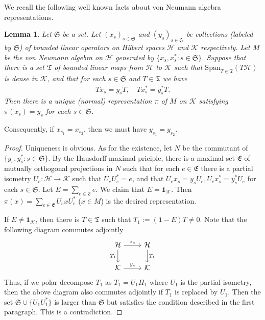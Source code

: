 \documentclass[12pt,a4paper,notitlepage]{article}
\theoremstyle{definition}
\theoremstyle{plain}
\newtheorem{lm}[df]{Lemma}
\newcommand{\fk}{\mathfrak}
\newcommand{\mc}{\mathcal}
\newcommand{\id}{\mathbf{1}}
\newcommand{\Span}{\mathrm{Span}}
\numberwithin{equation}{section}
\begin{document}
We recall the following well known facts about von Neumann algebra representations.
\begin{lm}\label{lb3}
Let $\fk S$ be a set. Let $(x_s)_{s\in\fk S}$ and $(y_s)_{s\in\fk S}$ be collections (labeled by $\fk S$) of bounded linear operators on Hilbert spaces $\mc H$ and $\mc K$ respectively. Let $M$ be the von Neumann algebra on $\mc H$ generated by $\{x_s,x_s^*:s\in \fk S\}$. Suppose that there is a set $\fk T$ of bounded  linear maps from $\mc H$ to $\mc K$ such that $\Span_{T\in\fk T}(T\mc H)$ is dense in $\mc K$, and that for each $s\in \fk S$ and $T\in\fk T$ we have
	\begin{align*}
		Tx_s=y_sT,\quad Tx_s^*=y_s^*T.	
	\end{align*}
	Then there is a unique  (normal) representation $\pi$ of $M$ on $\mc K$ satisfying $\pi(x_s)=y_s$ for each $s\in\fk S$.
\end{lm}

Consequently, if $x_{s_1}=x_{s_2}$, then we must have $y_{s_1}=y_{s_2}$.

\begin{proof}
	Uniqueness is obvious. As for the existence, let $N$ be the  commutant of $\{y_s,y_s^*:s\in\fk S\}$. By the Hausdorff maximal priciple, there is a maximal set $\fk E$ of mutually orthogonal projections in $N$ such that for each $e\in\fk E$ there is a partial isometry $U_e:\mc H\rightarrow\mc K$ such that $U_eU_e^*=e$, and that $U_ex_s=y_sU_e,U_ex_s^*=y_s^*U_e$ for each $s\in\fk S$.  Let $E=\sum_{e\in\fk E}e$. We claim that $E=\id_{\mc K}$. Then $\pi(x)=\sum_{e\in\fk E}U_exU_e^*$ ($x\in M$) is the desired representation. 
	
	If $E\neq \id_{\mc K}$, then there is $T\in\fk T$ such that $T_1:=(\id-E)T\neq 0$. Note that the following diagram commutes adjointly
	\begin{equation*}
		\begin{tikzcd}
			\mc H\arrow[r,"x_s"]\arrow[d,"T_1"']&\mc H\arrow[d,"T_1"]\\
			\mc K\arrow[r,"y_s"]&\mc K
		\end{tikzcd}	
	\end{equation*}
	Thus, if we polar-decompose $T_1$ as $T_1=U_1H_1$ where $U_1$ is the  partial isometry, then the above diagram also commutes adjointly if $T_1$ is replaced by $U_1$. Then the set $\fk S\cup\{U_1U_1^*\}$ is larger than $\fk S$ but satisfies the condition described in the first paragraph. This is a contradiction.
\end{proof}
\end{document}
